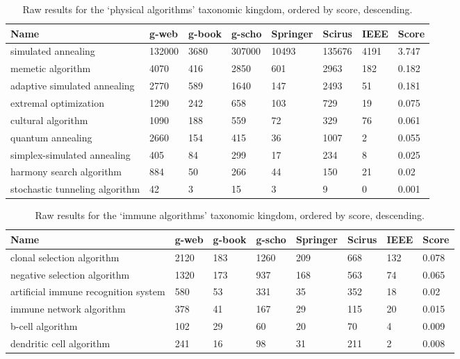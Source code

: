 \documentclass[a4paper, 11pt]{article}
\begin{document}
\begin{table}[htp]
	\centering\footnotesize
		\begin{tabularx}{\textwidth}{Xlllllll}
		\toprule
		\textbf{Name} & \textbf{g-web} & \textbf{g-book} & \textbf{g-scho} & \textbf{Springer} & \textbf{Scirus} & \textbf{IEEE} & \textbf{Score} \\ 
		\toprule
		simulated annealing & 132000 & 3680 & 307000 & 10493 & 135676 & 4191 & 3.747 \\ 
		memetic algorithm & 4070 & 416 & 2850 & 601 & 2963 & 182 & 0.182 \\ 
		adaptive simulated annealing & 2770 & 589 & 1640 & 147 & 2493 & 51 & 0.181 \\ 
		extremal optimization & 1290 & 242 & 658 & 103 & 729 & 19 & 0.075 \\ 
		cultural algorithm & 1090 & 188 & 559 & 72 & 329 & 76 & 0.061 \\ 
		quantum annealing & 2660 & 154 & 415 & 36 & 1007 & 2 & 0.055 \\ 
		simplex-simulated annealing & 405 & 84 & 299 & 17 & 234 & 8 & 0.025 \\ 
		harmony search algorithm & 884 & 50 & 266 & 44 & 150 & 21 & 0.02 \\ 
		stochastic tunneling algorithm & 42 & 3 & 15 & 3 & 9 & 0 & 0.001 \\ 
		\bottomrule
		\end{tabularx}	
	\caption{Raw results for the `physical algorithms' taxonomic kingdom, ordered by score, descending.}
	\label{tab:physical}
\end{table}

\begin{table}[htp]
	\centering\footnotesize
		\begin{tabularx}{\textwidth}{Xlllllll}
		\toprule
		\textbf{Name} & \textbf{g-web} & \textbf{g-book} & \textbf{g-scho} & \textbf{Springer} & \textbf{Scirus} & \textbf{IEEE} & \textbf{Score} \\ 
		\toprule
		clonal selection algorithm & 2120 & 183 & 1260 & 209 & 668 & 132 & 0.078 \\
		negative selection algorithm & 1320 & 173 & 937 & 168 & 563 & 74 & 0.065 \\
		artificial immune recognition system & 580 & 53 & 331 & 35 & 352 & 18 & 0.02 \\
		immune network algorithm & 378 & 41 & 167 & 29 & 115 & 20 & 0.015 \\
		b-cell algorithm & 102 & 29 & 60 & 20 & 70 & 4 & 0.009 \\
		dendritic cell algorithm & 241 & 16 & 98 & 31 & 211 & 2 & 0.008 \\
		\bottomrule
		\end{tabularx}	
	\caption{Raw results for the `immune algorithms' taxonomic kingdom, ordered by score, descending.}
	\label{tab:immune}
\end{table}
\end{document}
